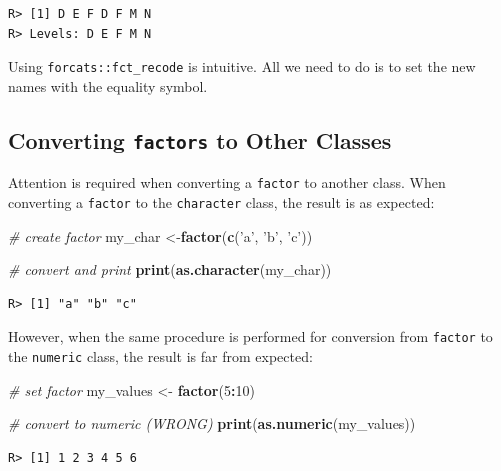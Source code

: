 \documentclass[
  12pt,
]{book}
\newenvironment{Shaded}{\begin{snugshade}}{\end{snugshade}}
\newcommand{\CommentTok}[1]{\textcolor[rgb]{0.37,0.37,0.37}{\textit{#1}}}
\newcommand{\DecValTok}[1]{\textcolor[rgb]{0.06,0.06,0.06}{#1}}
\newcommand{\KeywordTok}[1]{\textcolor[rgb]{0.27,0.27,0.27}{\textbf{#1}}}
\newcommand{\NormalTok}[1]{#1}
\newcommand{\OperatorTok}[1]{\textcolor[rgb]{0.43,0.43,0.43}{\textbf{#1}}}
\newcommand{\StringTok}[1]{\textcolor[rgb]{0.5,0.5,0.5}{#1}}
\begin{document}
\begin{verbatim}
R> [1] D E F D F M N
R> Levels: D E F M N
\end{verbatim}

Using \texttt{forcats::fct\_recode} is intuitive. All we need to do is to set the new names with the equality symbol.

\hypertarget{converting-factors-to-other-classes}{%
\subsection{\texorpdfstring{Converting \texttt{factors} to Other Classes}{Converting factors to Other Classes}}\label{converting-factors-to-other-classes}}

Attention is required when converting a \texttt{factor} to another class. When converting a \texttt{factor} to the \texttt{character} class, the result is as expected:

\begin{Shaded}
\begin{Highlighting}[]
\CommentTok{# create factor}
\NormalTok{my_char <-}\KeywordTok{factor}\NormalTok{(}\KeywordTok{c}\NormalTok{(}\StringTok{'a'}\NormalTok{, }\StringTok{'b'}\NormalTok{, }\StringTok{'c'}\NormalTok{))}

\CommentTok{# convert and print}
\KeywordTok{print}\NormalTok{(}\KeywordTok{as.character}\NormalTok{(my_char))}
\end{Highlighting}
\end{Shaded}

\begin{verbatim}
R> [1] "a" "b" "c"
\end{verbatim}

However, when the same procedure is performed for conversion from \texttt{factor} to the \texttt{numeric} class, the result is far from expected: 

\begin{Shaded}
\begin{Highlighting}[]
\CommentTok{# set factor}
\NormalTok{my_values <-}\StringTok{ }\KeywordTok{factor}\NormalTok{(}\DecValTok{5}\OperatorTok{:}\DecValTok{10}\NormalTok{)}

\CommentTok{# convert to numeric (WRONG)}
\KeywordTok{print}\NormalTok{(}\KeywordTok{as.numeric}\NormalTok{(my_values))}
\end{Highlighting}
\end{Shaded}

\begin{verbatim}
R> [1] 1 2 3 4 5 6
\end{verbatim}
\end{document}
